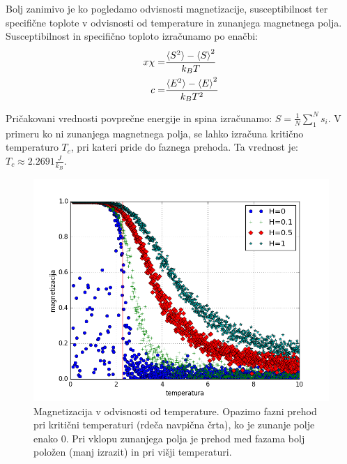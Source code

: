 \documentclass[slovene,11pt,a4paper]{article}
\numberwithin{equation}{section} %
\numberwithin{figure}{section} %
\numberwithin{table}{section} %
\begin{document}
\pagebreak

Bolj zanimivo je ko pogledamo odvisnosti magnetizacije, susceptibilnost ter specifične toplote v odvisnosti od temperature in zunanjega magnetnega polja.
Susceptibilnost in specifično toploto izračunamo po enačbi:
\begin{equation}
\begin{aligned}
x\chi =& \frac{\braket{S^2} -\braket{S}^2}{k_B T} \\
c =& \frac{\braket{E^2} -\braket{E}^2}{k_B T^2}
\end{aligned}
\end{equation}


Pričakovani vrednosti povprečne energije in spina izračunamo: $S=\frac{1}{N} \sum_1^N s_i$. V primeru ko ni zunanjega magnetnega polja, se lahko izračuna kritično temperaturo $T_c$, pri kateri pride do faznega prehoda. Ta vrednost je: $T_c \approx 2.2691 \frac{J}{k_B}$.


\begin{figure}[h]
\centering
\includegraphics[scale=0.7]{slike/magneizacija_tudi_zunanje2.png}
\caption{Magnetizacija v odvisnosti od temperature. Opazimo fazni prehod pri kritični temperaturi (rdeča navpična črta), ko je zunanje polje enako $0$. Pri vklopu zunanjega polja je prehod med fazama bolj položen (manj izrazit) in pri višji temperaturi.}
\end{figure}
\end{document}
